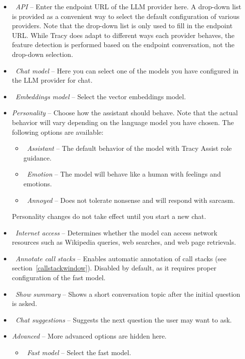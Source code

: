 \documentclass[hidelinks,titlepage,a4paper,twoside]{article}
\begin{document}
\begin{itemize}
\item \emph{\faPlug{}~API} -- Enter the endpoint URL of the LLM provider here. A drop-down list is provided as a convenient way to select the default configuration of various providers. Note that the drop-down list is only used to fill in the endpoint URL. While Tracy does adapt to different ways each provider behaves, the feature detection is performed based on the endpoint conversation, not the drop-down selection.
\item \emph{\faComments{}~Chat model} -- Here you can select one of the models you have configured in the LLM provider for chat.
\item \emph{\faBookBookmark{}~Embeddings model} -- Select the vector embeddings model.
\item \emph{Personality} -- Choose how the assistant should behave. Note that the actual behavior will vary depending on the language model you have chosen. The following options are available:
	\begin{itemize}
	\item \emph{\faFaceMeh{}~Assistant} -- The default behavior of the model with Tracy Assist role guidance.
	\item \emph{\faFaceGrin{}~Emotion} -- The model will behave like a human with feelings and emotions.
	\item \emph{\faFaceFrown{}~Annoyed} -- Does not tolerate nonsense and will respond with sarcasm.
	\end{itemize}
Personality changes do not take effect until you start a new chat.
\item \emph{\faEarthAmericas{}~Internet access} -- Determines whether the model can access network resources such as Wikipedia queries, web searches, and web page retrievals.
\item \emph{\faTag{}~Annotate call stacks} -- Enables automatic annotation of call stacks (see section~\ref{callstackwindow}). Disabled by default, as it requires proper configuration of the fast model.
\item \emph{\faHandPointRight{}~Show summary} -- Shows a short conversation topic after the initial question is asked.
\item \emph{\faCommentDots{}~Chat suggestions} -- Suggests the next question the user may want to ask.
\item \emph{Advanced} -- More advanced options are hidden here.
\begin{itemize}
\item \emph{\faBoltLightning{}~Fast model} -- Select the fast model.

\end{itemize}
\end{itemize}
\end{document}
